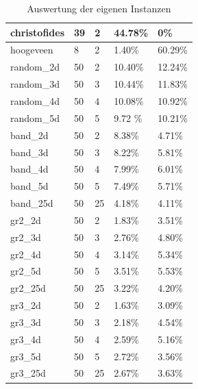 \documentclass[11pt,a4paper]{article}
\begin{document}
\begin{table}[H]
\begin{tabular}{| p{2.0cm} | p{2.0cm} | p{2.5cm} | p{2.5cm} | p{2.5cm} |}
                    christofides    & 39    & 2     &  44.78\%  &      0\%           \\ \hline
                    hoogeveen       & 8     & 2     &   1.40\%  &  60.29\%       \\ \hline
                    random\_2d      & 50    & 2     &  10.40\%  &  12.24\%       \\ \hline
                    random\_3d      & 50    & 3     &  10.44\%  &  11.83\%       \\ \hline
                    random\_4d      & 50    & 4     &  10.08\%  &  10.92\%        \\ \hline
                    random\_5d      & 50    & 5     &  9.72 \%  &  10.21\%        \\ \hline
                    band\_2d        & 50    & 2     &   8.38\%  &   4.71\%        \\ \hline
                    band\_3d        & 50    & 3     &   8.22\%  &   5.81\%        \\ \hline
                    band\_4d        & 50    & 4     &   7.99\%  &   6.01\%        \\ \hline
                    band\_5d        & 50    & 5     &   7.49\%  &   5.71\%       \\ \hline
                    band\_25d       & 50    & 25    &   4.18\%  &   4.11\%       \\ \hline
                    gr2\_2d         & 50    & 2     &   1.83\%  &   3.51\%        \\ \hline
                    gr2\_3d         & 50    & 3     &   2.76\%  &   4.80\%        \\ \hline
                    gr2\_4d         & 50    & 4     &   3.14\%  &   5.34\%        \\ \hline
                    gr2\_5d         & 50    & 5     &   3.51\%  &   5.53\%       \\ \hline
                    gr2\_25d        & 50    & 25    &   3.22\%  &   4.20\%       \\ \hline
                    gr3\_2d         & 50    & 2     &   1.63\%  &   3.09\%        \\ \hline
                    gr3\_3d         & 50    & 3     &   2.18\%  &   4.54\%        \\ \hline
                    gr3\_4d         & 50    & 4     &   2.59\%  &   5.16\%        \\ \hline
                    gr3\_5d         & 50    & 5     &   2.72\%  &   3.56\%       \\ \hline
                    gr3\_25d        & 50    & 25    &   2.67\%  &   3.63\%       \\ \hline
               \end{tabular}
                \caption{Auswertung der eigenen Instanzen}
                \label{tab:instanz_eigene_instanzen}
        \end{table}
\newpage
\end{document}
